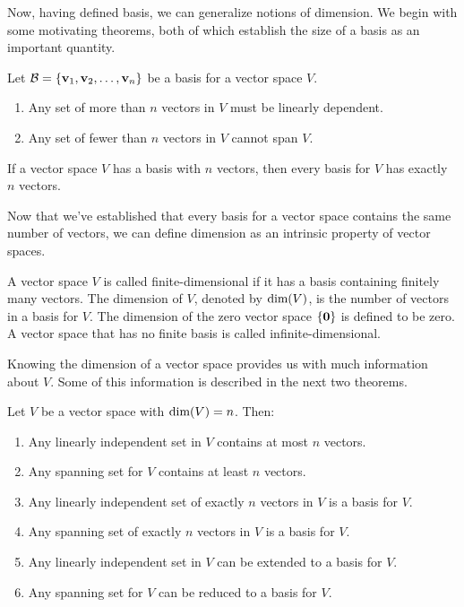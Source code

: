 \documentclass[../m73main.tex]{subfiles}
\begin{document}
Now, having defined basis, we can generalize notions of dimension.
We begin with some motivating theorems, both of which establish the size of a basis as an important quantity.

\begin{theorem}
	Let $\mathcal{B} = \{\mathbf{v}_1, \mathbf{v}_2, \ldots, \mathbf{v}_n\}$ be a basis for a vector space $V$.
	\begin{enumerate}[label=(\alph*)]
		\item Any set of more than $n$ vectors in $V$ must be linearly dependent.
		\item Any set of fewer than $n$ vectors in $V$ cannot span $V$.
	\end{enumerate}
\end{theorem}

\begin{theorem}
	If a vector space $V$ has a basis with $n$ vectors, then every basis for $V$ has exactly $n$ vectors.
\end{theorem}

Now that we've established that every basis for a vector space contains the same number of vectors, we can define dimension as an intrinsic property of vector spaces.

\begin{definition}[Dimension]
	A vector space $V$ is called finite-dimensional if it has a basis containing finitely many vectors.
	The dimension of $V$, denoted by $\textrm{dim}(V)$, is the number of vectors in a basis for $V$.
	The dimension of the zero vector space $\{\mathbf{0}\}$ is defined to be zero.
	A vector space that has no finite basis is called infinite-dimensional.
\end{definition}

Knowing the dimension of a vector space provides us with much information about $V$.
Some of this information is described in the next two theorems.

\begin{theorem}
	Let $V$ be a vector space with $\textrm{dim}(V) = n$.
	Then:
	\begin{enumerate}[label=(\alph*)]
		\item Any linearly independent set in $V$ contains at most $n$ vectors.
		\item Any spanning set for $V$ contains at least $n$ vectors.
		\item Any linearly independent set of exactly $n$ vectors in $V$ is a basis for $V$.
		\item Any spanning set of exactly $n$ vectors in $V$ is a basis for $V$.
		\item Any linearly independent set in $V$ can be extended to a basis for $V$.
		\item Any spanning set for $V$ can be reduced to a basis for $V$.
	\end{enumerate}
\end{theorem}
\end{document}
